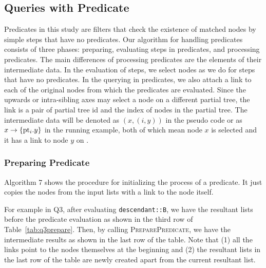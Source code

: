 \subsection{Queries with Predicate}
\label{sec:predicate}

Predicates in this study are filters that check the existence of matched nodes
by simple steps that have no predicates. Our algorithm for handling predicates
consists of three phases: preparing, evaluating steps in predicates, and
processing predicates. The main differences of processing predicates are the
elements of their intermediate data. In the evaluation of steps, we select nodes
as we do for steps that have no predicates. In the querying in predicates, we
also attach a link to each of the original nodes from which the predicates are
evaluated. Since the upwards or intra-sibling axes may select a node on a
different partial tree, the link is a pair of partial tree id and the index of
nodes in the partial tree. The intermediate data will be denoted as $(x, (i,
y))$ in the pseudo code or as $x\to\{\hbox{\textrm{pt}$_{i}$}.y\}$ in the running example, both
of which mean node $x$ is selected and it has a link to node $y$ on .

\subsubsection{Preparing Predicate}

Algorithm 7 shows the procedure for initializing the process of a predicate.
It just copies the nodes from the input lists with a link to the node itself.

For example in Q3, after evaluating \texttt{descendant::B}, we have the
resultant lists  before the predicate evaluation as shown in the third row of
Table~\ref{tab:q3prepare}. Then, by calling \textsc{PreparePredicate}, we have
the intermediate results as shown in the last row of the table. Note that (1)
all the links point to the nodes themselves at the beginning and (2) the
resultant lists in the last row of the table are newly created apart from the
current resultant list.

